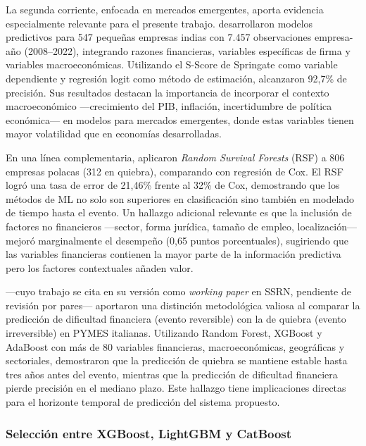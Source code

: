 \documentclass[12pt, letterpaper]{article}
\begin{document}
La segunda corriente, enfocada en mercados emergentes, aporta evidencia especialmente relevante para el presente trabajo. \citet{Mahesh2025} desarrollaron modelos predictivos para 547 peque\~nas empresas indias con 7.457 observaciones empresa-a\~no (2008--2022), integrando razones financieras, variables espec\'ificas de firma y variables macroecon\'omicas. Utilizando el S-Score de Springate como variable dependiente y regresi\'on logit como m\'etodo de estimaci\'on, alcanzaron 92,7\% de precisi\'on. Sus resultados destacan la importancia de incorporar el contexto macroecon\'omico ---crecimiento del PIB, inflaci\'on, incertidumbre de pol\'itica econ\'omica--- en modelos para mercados emergentes, donde estas variables tienen mayor volatilidad que en econom\'ias desarrolladas.

En una l\'inea complementaria, \citet{PtakChmielewska2020} aplicaron \textit{Random Survival Forests} (RSF) a 806 empresas polacas (312 en quiebra), comparando con regresi\'on de Cox. El RSF logr\'o una tasa de error de 21,46\% frente al 32\% de Cox, demostrando que los m\'etodos de ML no solo son superiores en clasificaci\'on sino tambi\'en en modelado de tiempo hasta el evento. Un hallazgo adicional relevante es que la inclusi\'on de factores no financieros ---sector, forma jur\'idica, tama\~no de empleo, localizaci\'on--- mejor\'o marginalmente el desempe\~no (0,65 puntos porcentuales), sugiriendo que las variables financieras contienen la mayor parte de la informaci\'on predictiva pero los factores contextuales a\~naden valor.

\citet{Bortolotti2024} ---cuyo trabajo se cita en su versi\'on como \textit{working paper} en SSRN, pendiente de revisi\'on por pares--- aportaron una distinci\'on metodol\'ogica valiosa al comparar la predicci\'on de dificultad financiera (evento reversible) con la de quiebra (evento irreversible) en PYMES italianas. Utilizando Random Forest, XGBoost y AdaBoost con m\'as de 80 variables financieras, macroecon\'omicas, geogr\'aficas y sectoriales, demostraron que la predicci\'on de quiebra se mantiene estable hasta tres a\~nos antes del evento, mientras que la predicci\'on de dificultad financiera pierde precisi\'on en el mediano plazo. Este hallazgo tiene implicaciones directas para el horizonte temporal de predicci\'on del sistema propuesto.

\subsubsection{Selecci\'on entre XGBoost, LightGBM y CatBoost}
\label{sec:gbdt-comparison}
\end{document}
